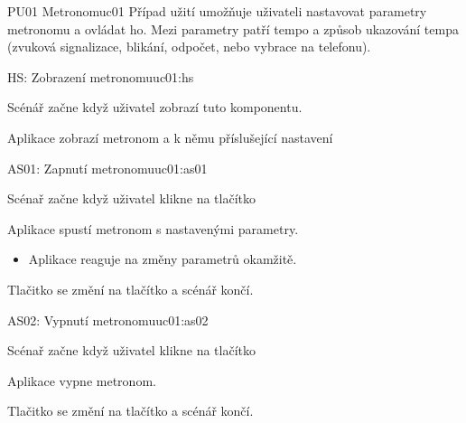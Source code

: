 \begin{usecase}{PU01 Metronom}{uc01}
    Případ užití umožňuje uživateli nastavovat parametry metronomu a ovládat ho. Mezi parametry patří tempo a způsob ukazování tempa (zvuková signalizace, blikání, odpočet, nebo vybrace na telefonu).

    \begin{scenario}{HS: Zobrazení metronomu}{uc01:hs}
        \item Scénář začne když uživatel zobrazí tuto komponentu.
        \item Aplikace zobrazí metronom a k němu příslušející nastavení
    \end{scenario}

    \begin{scenario}{AS01: Zapnutí metronomu}{uc01:as01}
        \item Scénař začne když uživatel klikne na tlačítko 
        \item Aplikace spustí metronom s nastavenými parametry.
        \begin{itemize}
            \item Aplikace reaguje na změny parametrů okamžitě.
        \end{itemize}
        \item Tlačitko  se změní na tlačítko  a scénář končí.
    \end{scenario}

    \begin{scenario}{AS02: Vypnutí metronomu}{uc01:as02}
        \item Scénař začne když uživatel klikne na tlačítko 
        \item Aplikace vypne metronom.
        \item Tlačitko  se změní na tlačítko  a scénář končí.
    \end{scenario}
\end{usecase}